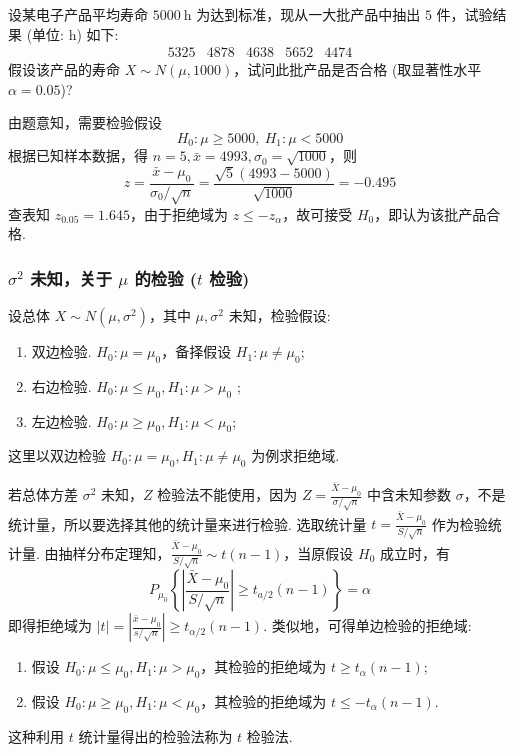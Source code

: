 \begin{example}
    设某电子产品平均寿命 $ 5000 \mathrm{~h} $ 为达到标准，现从一大批产品中抽出 $5$ 件，试验结果 (单位: h) 如下:
    $$\begin{array}{lllll}
            5325 & 4878 & 4638 & 5652 & 4474
        \end{array}$$
    假设该产品的寿命 $ X \sim N(\mu, 1000)$，试问此批产品是否合格 (取显著性水平 $ \alpha=0.05$)?
\end{example}
\begin{solution}
    由题意知，需要检验假设
    $$H_0:\mu\geqslant 5000,~H_1:\mu<5000$$
    根据已知样本数据，得 $ n=5, \bar{x}=4993, \sigma_{0}=\sqrt{1000} $，则
    $$z=\frac{\bar{x}-\mu_{0}}{\sigma_{0} / \sqrt{n}}=\frac{\sqrt{5}(4993-5000)}{\sqrt{1000}}=-0.495$$
    查表知 $ z_{0.05}=1.645 $，由于拒绝域为 $ z \leqslant-z_{\alpha}$，故可接受 $ H_{0}$，即认为该批产品合格.
\end{solution}

\subsubsection{\texorpdfstring{$\sigma^2$}. 未知，关于 \texorpdfstring{$\mu$}. 的检验 (\texorpdfstring{$t$}. 检验)}

设总体 $ X \sim N\left(\mu, \sigma^{2}\right) $，其中 $ \mu, \sigma^{2} $ 未知，检验假设:
\begin{enumerate}[label=(\arabic{*})]
    \item 双边检验. $ H_{0}: \mu=\mu_{0} $，备择假设 $ H_{1}: \mu \neq \mu_{0} $;
    \item 右边检验. $ H_{0}: \mu \leqslant \mu_{0}, H_{1}: \mu>\mu_{0}$ ;
    \item 左边检验. $ H_{0}: \mu \geqslant \mu_{0}, H_{1}: \mu<\mu_{0} $;
\end{enumerate}
这里以双边检验 $ H_{0}: \mu=\mu_{0}, H_{1}: \mu \neq \mu_{0} $ 为例求拒绝域.

若总体方差 $ \sigma^{2} $ 未知，$Z $ 检验法不能使用，因为 $\displaystyle Z=\frac{\bar{X}-\mu_{0}}{\sigma / \sqrt{n}} $ 中含未知参数 $\sigma$，不是统计量，所以要选择其他的统计量来进行检验.
选取统计量 $\displaystyle t=\frac{\bar{X}-\mu_{0}}{S / \sqrt{n}} $ 作为检验统计量.
由抽样分布定理知，$\displaystyle\frac{\bar{X}-\mu_{0}}{S / \sqrt{n}} \sim t(n-1)$，当原假设 $ H_{0} $ 成立时，有
$$P_{\mu_{0}}\left\{\left|\frac{\bar{X}-\mu_{0}}{S / \sqrt{n}}\right| \geqslant t_{a / 2}(n-1)\right\}=\alpha$$
即得拒绝域为 $\displaystyle |t|=\left|\frac{\bar{x}-\mu_{0}}{s / \sqrt{n}}\right| \geqslant t_{\alpha / 2}(n-1)$. 
类似地，可得单边检验的拒绝域:
\begin{enumerate}[label=(\arabic{*})]
    \item 假设 $ H_{0}: \mu \leqslant \mu_{0}, H_{1}: \mu>\mu_{0}$，其检验的拒绝域为 $ t \geqslant t_{\alpha}(n-1) $;
    \item 假设 $ H_{0}: \mu \geqslant \mu_{0}, H_{1}: \mu<\mu_{0}$，其检验的拒绝域为 $ t \leqslant-t_{\alpha}(n-1) $.
\end{enumerate}
这种利用 $ t $ 统计量得出的检验法称为 $ t $ 检验法.

